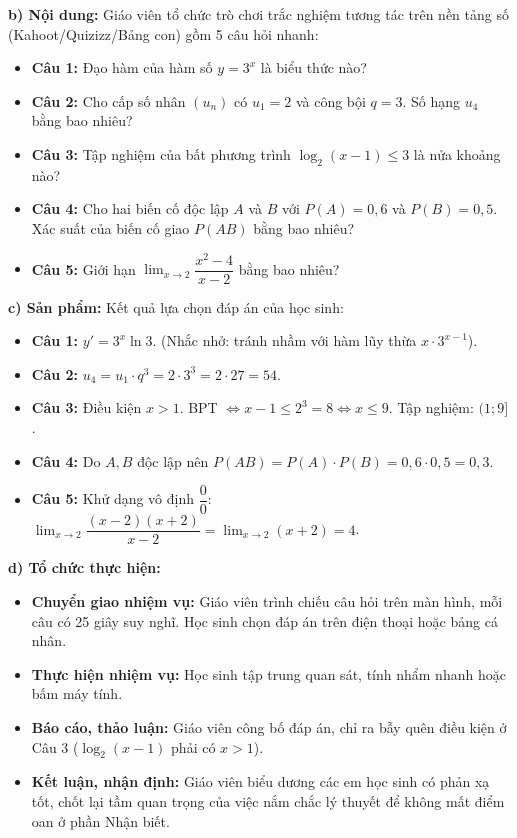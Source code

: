 \documentclass[12pt, a4paper]{article}
\begin{document}
\noindent \textbf{b) Nội dung:}
Giáo viên tổ chức trò chơi trắc nghiệm tương tác trên nền tảng số (Kahoot/Quizizz/Bảng con) gồm 5 câu hỏi nhanh:
\begin{itemize}[leftmargin=0.6cm]
    \item \textbf{Câu 1:} Đạo hàm của hàm số $y = 3^x$ là biểu thức nào?
    \item \textbf{Câu 2:} Cho cấp số nhân $(u_n)$ có $u_1 = 2$ và công bội $q = 3$. Số hạng $u_4$ bằng bao nhiêu?
    \item \textbf{Câu 3:} Tập nghiệm của bất phương trình $\log_2(x - 1) \le 3$ là nửa khoảng nào?
    \item \textbf{Câu 4:} Cho hai biến cố độc lập $A$ và $B$ với $P(A) = 0{,}6$ và $P(B) = 0{,}5$. Xác suất của biến cố giao $P(AB)$ bằng bao nhiêu?
    \item \textbf{Câu 5:} Giới hạn $\lim_{x \to 2} \dfrac{x^2 - 4}{x - 2}$ bằng bao nhiêu?
\end{itemize}

\noindent \textbf{c) Sản phẩm:}
Kết quả lựa chọn đáp án của học sinh:
\begin{itemize}[leftmargin=0.6cm]
    \item \textbf{Câu 1:} $y' = 3^x \ln 3$. (Nhắc nhở: tránh nhầm với hàm lũy thừa $x \cdot 3^{x-1}$).
    \item \textbf{Câu 2:} $u_4 = u_1 \cdot q^3 = 2 \cdot 3^3 = 2 \cdot 27 = 54$.
    \item \textbf{Câu 3:} Điều kiện $x > 1$. BPT $\iff x - 1 \le 2^3 = 8 \iff x \le 9$. Tập nghiệm: $(1; 9]$.
    \item \textbf{Câu 4:} Do $A, B$ độc lập nên $P(AB) = P(A) \cdot P(B) = 0{,}6 \cdot 0{,}5 = 0{,}3$.
    \item \textbf{Câu 5:} Khử dạng vô định $\dfrac{0}{0}$: $\lim_{x \to 2} \dfrac{(x-2)(x+2)}{x-2} = \lim_{x \to 2} (x+2) = 4$.
\end{itemize}

\noindent \textbf{d) Tổ chức thực hiện:}
\begin{itemize}[leftmargin=0.6cm]
    \item \textbf{Chuyển giao nhiệm vụ:} Giáo viên trình chiếu câu hỏi trên màn hình, mỗi câu có 25 giây suy nghĩ. Học sinh chọn đáp án trên điện thoại hoặc bảng cá nhân.
    \item \textbf{Thực hiện nhiệm vụ:} Học sinh tập trung quan sát, tính nhẩm nhanh hoặc bấm máy tính.
    \item \textbf{Báo cáo, thảo luận:} Giáo viên công bố đáp án, chỉ ra bẫy quên điều kiện ở Câu 3 ($\log_2(x-1)$ phải có $x > 1$).
    \item \textbf{Kết luận, nhận định:} Giáo viên biểu dương các em học sinh có phản xạ tốt, chốt lại tầm quan trọng của việc nắm chắc lý thuyết để không mất điểm oan ở phần Nhận biết.
\end{itemize}
\end{document}
